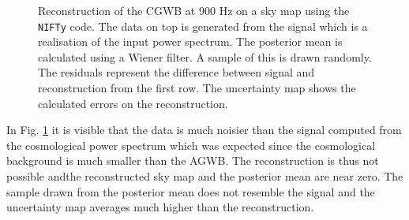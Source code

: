 \begin{figure}[h]
    \centering
    \newline
    \vspace{-1.5cm}
    \caption[Reconstruction of the CGWB at 900 Hz on a sky map using the {\tt NIFTy} code.]{Reconstruction of the CGWB at 900 Hz on a sky map using the {\tt NIFTy} code. The data on top is generated from the signal which is a realisation of the input power spectrum. The posterior mean is calculated using a Wiener filter. A sample of this is drawn randomly. The residuals represent the difference between signal and reconstruction from the first row. The uncertainty map shows the calculated errors on the reconstruction.}
    \label{sky_maps_cosmo}
\end{figure}

In Fig. \ref{sky_maps_cosmo} it is visible that the data is much noisier than the signal computed from the cosmological power spectrum which was expected since the cosmological background is much smaller than the AGWB. The reconstruction is thus not possible andthe reconstructed sky map and the posterior mean are near zero. The sample drawn from the posterior mean does not resemble the signal and the uncertainty map averages much higher than the reconstruction. 

